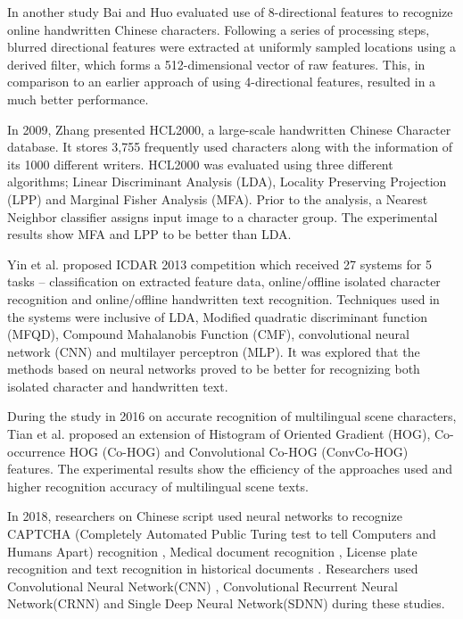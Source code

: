 \documentclass{article}
\begin{document}
In another study Bai and Huo \cite{bai2005study} evaluated use of 8-directional features to recognize online handwritten Chinese characters. Following a series of processing steps, blurred directional features were extracted at uniformly sampled locations using a derived filter, which forms a 512-dimensional vector of raw features. This, in comparison to an earlier approach of using 4-directional features, resulted in a much better performance.  



In 2009, Zhang \cite{zhang2009hcl2000} presented HCL2000, a large-scale handwritten Chinese Character database. It stores 3,755 frequently used characters along with the information of its 1000 different writers. HCL2000 was evaluated using three different algorithms; Linear Discriminant Analysis (LDA), Locality Preserving Projection (LPP) and Marginal Fisher Analysis (MFA). Prior to the analysis, a Nearest Neighbor classifier assigns input image to a character group. The experimental results show MFA and LPP to be better than LDA. 


Yin et al. \cite{yin2013icdar} proposed ICDAR 2013 competition which received 27 systems for 5 tasks – classification on extracted feature data, online/offline isolated character recognition and online/offline handwritten text recognition. Techniques used in the systems were inclusive of LDA, Modified quadratic discriminant function (MFQD), Compound Mahalanobis Function (CMF), convolutional neural network (CNN) and multilayer perceptron (MLP). It was explored that the methods based on neural networks proved to be better for recognizing both isolated character and handwritten text. 

During the study in 2016 on accurate recognition of multilingual scene characters, Tian et al. \cite{tian2016multilingual} proposed an extension of Histogram of Oriented Gradient (HOG), Co-occurrence HOG (Co-HOG) and Convolutional Co-HOG (ConvCo-HOG) features. The experimental results show the efficiency of the approaches used and higher recognition accuracy of multilingual scene texts. 

In 2018, researchers on Chinese script used neural networks to recognize CAPTCHA (Completely Automated Public Turing test to tell Computers and Humans Apart) recognition \cite{lin2018chinese}, Medical document recognition \cite{zhao2018multi}, License plate recognition \cite{luo2018multiple} and text recognition in historical documents \cite{yang2018recognition}. Researchers used Convolutional Neural Network(CNN) \cite{lin2018chinese,yang2018recognition}, Convolutional Recurrent Neural Network(CRNN) \cite{zhao2018multi} and Single Deep Neural Network(SDNN) \cite{luo2018multiple} during these studies. 
\end{document}
